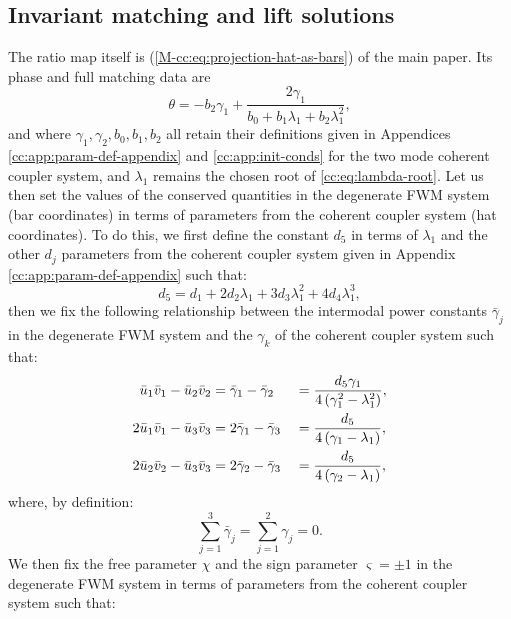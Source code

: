 \documentclass[11pt,a4paper]{article}
\newcommand{\externaleqref}[1]{\textup{(\ref*{#1})}}
\begin{document}
\subsection{Invariant matching and lift solutions}
The ratio map itself is \externaleqref{M-cc:eq:projection-hat-as-bars} of the main paper. Its phase and full matching data are
\begin{equation}
\theta = - {b}_{2} {\gamma}_{1} + \frac{2 {\gamma}_{1}}{{b}_{0} + {b}_{1} {\lambda}_{1} + {b}_{2} {\lambda}_{1}^{2}},
\end{equation}
and where $\gamma_1, \gamma_2, b_0, b_1, b_2$ all retain their definitions given in Appendices \ref{cc:app:param-def-appendix} and \ref{cc:app:init-conds} for the two mode coherent coupler system, and $\lambda_1$ remains the chosen root of \eqref{cc:eq:lambda-root}.
Let us then set the values of the conserved quantities in the degenerate FWM system (bar coordinates) in terms of parameters from the coherent coupler system (hat coordinates).
To do this, we first define the constant $d_5$ in terms of $\lambda_1$ and the other $d_j$ parameters from the coherent coupler system given in Appendix \ref{cc:app:param-def-appendix} such that:
\begin{equation}
{d}_{5} = {d}_{1} + 2 {d}_{2} {\lambda}_{1} + 3 {d}_{3} {\lambda}_{1}^{2} + 4 {d}_{4} {\lambda}_{1}^{3},
\end{equation}
then we fix the following relationship between the intermodal power constants $\bar{\gamma}_j$ in the degenerate FWM system and the $\gamma_k$ of the coherent coupler system such that:
\begin{alignat}{2}
\bar{u}_1\bar{v}_1 - \bar{u}_2\bar{v}_2 &= \bar{\gamma}_1 - \bar{\gamma}_2 &&= \frac{{d}_{5} {\gamma}_{1}}{4 \left({\gamma}_{1}^{2} -  {\lambda}_{1}^{2}\right)}, \notag \\
2\bar{u}_1\bar{v}_1 - \bar{u}_3\bar{v}_3 &= 2\bar{\gamma}_1 - \bar{\gamma}_3 &&= \frac{d_5}{4\left(\gamma_1 - \lambda_1\right)}, \notag \\
2\bar{u}_2\bar{v}_2 - \bar{u}_3\bar{v}_3 &= 2\bar{\gamma}_2 - \bar{\gamma}_3 &&= \frac{d_5}{4\left(\gamma_2 - \lambda_1\right)},
\end{alignat}
where, by definition:
\begin{equation}
\sum_{j=1}^{3} {\bar{\gamma}}_{j} = \sum_{j=1}^{2} {\gamma}_{j} = 0.
\end{equation}
We then fix the free parameter $\chi$ and the sign parameter $\varsigma=\pm1$ in the degenerate FWM system in terms of parameters from the coherent coupler system such that:
\end{document}
